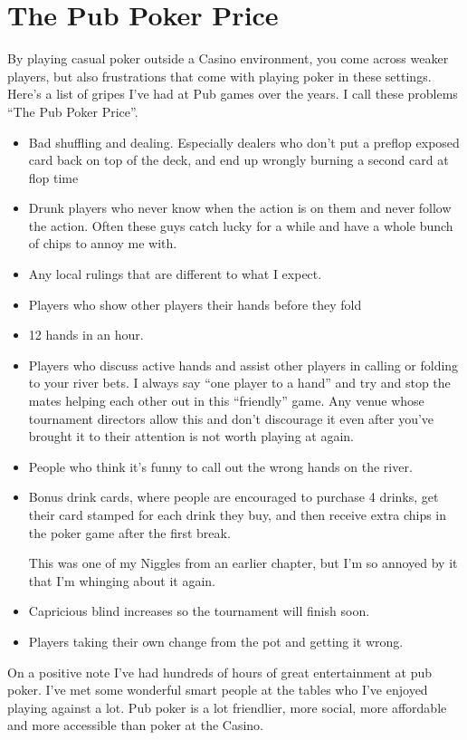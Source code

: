 \chapter{The Pub Poker Price}


By playing casual poker outside a Casino environment, you come across
weaker players, but also frustrations that come with playing
poker in these settings. Here's a list of gripes I've had at Pub
games over the years. I call these problems ``The Pub Poker Price''.

\begin{itemize}

\item Bad shuffling and dealing. Especially dealers who don't
put a preflop exposed card back on top of the deck, and end
up wrongly burning a second card at flop time

\item Drunk players who never know when the action is on them and
never follow the action. Often these guys catch lucky for a while
and have a whole bunch of chips to annoy me with.

\item Any local rulings that are different to what I expect.

\item Players who show other players their hands before they fold

\item 12 hands in an hour.

\item Players who discuss active hands and assist other players in
calling or folding to your river bets. I always say ``one
player to a hand'' and try and stop the mates helping each other
out in this ``friendly'' game. Any venue whose tournament directors
allow this and don't discourage it even after you've brought
it to their attention is not worth playing at again.

\item People who think it's funny to call out the wrong hands on the river.

\item Bonus drink cards, where people are encouraged to purchase 4 drinks,
get their card stamped for each drink they buy, and then receive extra
chips in the poker game after the first break.

This was one of my Niggles from an earlier chapter, but I'm so annoyed
by it that I'm whinging about it again.

\item Capricious blind increases so the tournament will finish soon.

\item Players taking their own change from the pot and getting it wrong.

\end{itemize}

On a positive note I've
had hundreds of hours of great entertainment at pub poker. I've
met some wonderful smart people at the tables who I've enjoyed playing
against a lot. Pub poker is a lot friendlier, more social, more affordable
and more accessible than poker at the Casino.

